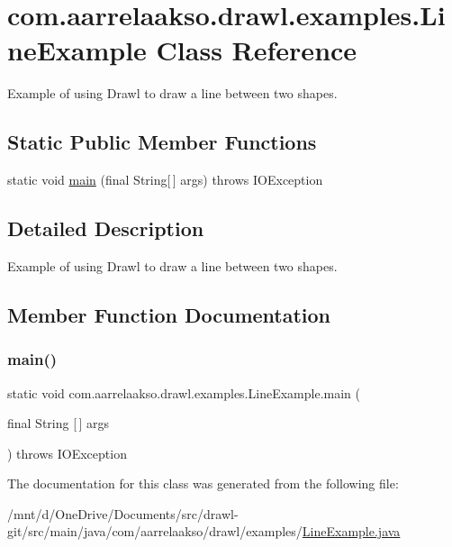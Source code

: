 \hypertarget{classcom_1_1aarrelaakso_1_1drawl_1_1examples_1_1_line_example}{}\section{com.\+aarrelaakso.\+drawl.\+examples.\+Line\+Example Class Reference}
\label{classcom_1_1aarrelaakso_1_1drawl_1_1examples_1_1_line_example}


Example of using Drawl to draw a line between two shapes.  


\subsection*{Static Public Member Functions}
\begin{DoxyCompactItemize}
\item 
static void \hyperlink{classcom_1_1aarrelaakso_1_1drawl_1_1examples_1_1_line_example_a2e44cc23cd7863a19e87313fa4d7f6c3}{main} (final String\mbox{[}$\,$\mbox{]} args)  throws I\+O\+Exception     
\end{DoxyCompactItemize}


\subsection{Detailed Description}
Example of using Drawl to draw a line between two shapes. 

\subsection{Member Function Documentation}
\mbox{\label{classcom_1_1aarrelaakso_1_1drawl_1_1examples_1_1_line_example_a2e44cc23cd7863a19e87313fa4d7f6c3}} 
\subsubsection{\texorpdfstring{main()}{main()}}
{\footnotesize\ttfamily static void com.\+aarrelaakso.\+drawl.\+examples.\+Line\+Example.\+main (\begin{DoxyParamCaption}\item[{final String \mbox{[}$\,$\mbox{]}}]{args }\end{DoxyParamCaption}) throws I\+O\+Exception\hspace{0.3cm}{\ttfamily [static]}}



The documentation for this class was generated from the following file\+:\begin{DoxyCompactItemize}
\item 
/mnt/d/\+One\+Drive/\+Documents/src/drawl-\/git/src/main/java/com/aarrelaakso/drawl/examples/\hyperlink{_line_example_8java}{Line\+Example.\+java}\end{DoxyCompactItemize}
